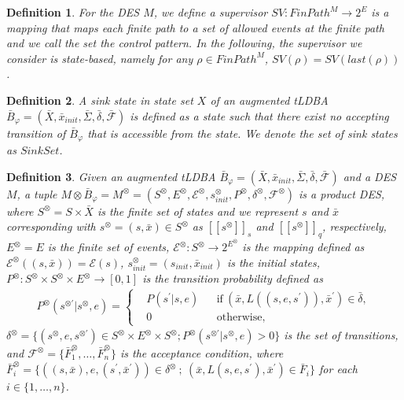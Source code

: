 \documentclass[letterpaper, 10 pt, conference]{ieeeconf}
\newtheorem{definition}{Definition}
\newcommand{\mysps}{\ensuremath{[\![s^{\otimes}]\!]}_s}
\newcommand{\myspq}{\ensuremath{[\![s^{\otimes}]\!]}_q}
\begin{document}
\begin{definition}
For the DES $M$,  we define a supervisor $SV : FinPath^{M} \rightarrow 2^E$ is a mapping that maps each finite path to a set of allowed events at the finite path and we call the set the control pattern. In the following, the supervisor we consider is {\it state-based}, namely for any $\rho \in FinPath^{M}$, $SV(\rho) = SV(last(\rho))$.
\end{definition}

\begin{definition}
  A sink state in state set $X$ of an augmented tLDBA $\bar{B}_{\varphi} = (\bar{X}, \bar{x}_{init},\bar{\Sigma},\bar{\delta},\bar{\mathcal{F}})$ is defined as a state such that there exist no accepting transition of $\bar{B}_{\varphi}$ that is accessible from the state. We denote the set of sink states as $Sink Set$.
\end{definition}

\begin{definition}
  Given an augmented tLDBA $\bar{B}_{\varphi} = (\bar{X}, \bar{x}_{init},\bar{\Sigma},\bar{\delta},\bar{\mathcal{F}})$ and a DES $M$, a tuple $M \otimes \bar{B}_{\varphi} = M^{\otimes} = (S^{\otimes}, E^{\otimes}, {\mathcal E}^{\otimes}, s_{init}^{\otimes}, P^{\otimes}, \delta^{\otimes}, {\mathcal F}^{\otimes})$ is a product DES, where
  $S^{\otimes} = S \times \bar{X}$ is the finite set of states and we represent $s$ and $\bar{x}$ corresponding with $s^{\otimes} = (s,\bar{x}) \in S^{\otimes}$ as $\mysps$ and $\myspq$, respectively, $E^{\otimes}=E$ is the finite set of events, ${\mathcal E}^{\otimes} : S^{\otimes} \rightarrow 2^{E^{\otimes}}$ is the mapping defined as ${\mathcal E}^{\otimes}((s,\bar{x})) = {\mathcal E}(s)$, $s_{init}^{\otimes} = (s_{init},\bar{x}_{init})$ is the initial states, $P^{\otimes} : S^{\otimes} \times S^{\otimes} \times E^{\otimes} \rightarrow [0,1]$ is the transition probability defined as
  \begin{align}
    P^{\otimes}(s^{\otimes \prime} | s^{\otimes}, e) =
    \left\{
    \begin{aligned}
      &P(s^{\prime} | s, e) &   &\text{if}\  (\bar{x}, L((s,e,s^{\prime})), \bar{x}^{\prime}) \in \bar{\delta},\\
      &0 &   &\text{otherwise} ,
    \end{aligned}
    \right. \nonumber
  \end{align}
  $\delta^{\otimes} = \{ (s^{\otimes}, e, s^{\otimes \prime}) \in S^{\otimes} \times E^{\otimes} \times S^{\otimes} ; P^{\otimes}(s^{\otimes \prime} | s^{\otimes}, e) > 0 \}$ is the set of transitions, and ${\mathcal F}^{\otimes} = \{ \bar{F}^{\otimes}_1, \ldots ,\bar{F}^{\otimes}_n \}$ is the acceptance condition, where $\bar{F}^{\otimes}_i = \{ ((s,\bar{x}), e, (s^{\prime}, \bar{x}^{\prime})) \in \delta^{\otimes}\ ;\ (\bar{x}, L(s,e,s^{\prime}), \bar{x}^{\prime}) \in \bar{F}_i \}$ for each $ i \in \{ 1, \ldots ,n \}$.
\end{definition}
\end{document}
